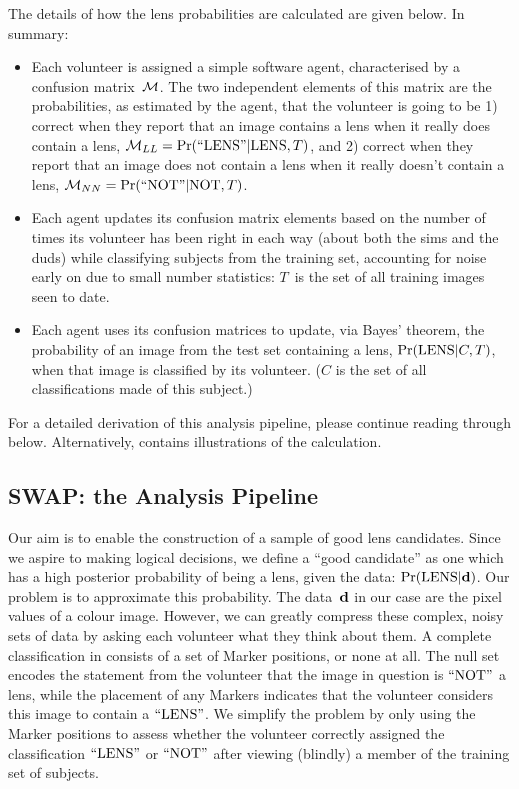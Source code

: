 \documentclass[useAMS,usenatbib,a4paper]{mn2e}
\begin{document}
The details of how the lens probabilities are calculated are given below.
In summary:
\begin{itemize}

\item Each volunteer is assigned a simple software agent, characterised by a
confusion matrix~$\mathcal{M}$. The two independent elements of this matrix are the
probabilities, as estimated by the agent, that the volunteer is going to be 1)
correct when they report that an image contains a lens when it really does
contain a lens, $\mathcal{M}_{LL} = {\rm Pr}({\rm ``LENS"}|{\rm LENS},T)$, and 2) correct when they report that
an image does not contain a lens when it really doesn't contain a lens,
$\mathcal{M}_{NN} = {\rm Pr}({\rm ``NOT"}|{\rm NOT},T)$.

\item Each agent updates its confusion matrix elements based on the number of
times its volunteer has been right in each way (about both the sims and the
duds) while classifying subjects from the training set, accounting for noise
early on due to small number statistics: $T$~is the set of all training images
seen to date.

\item Each agent uses its confusion matrices to update, via Bayes' theorem,
the probability of an image from the test set containing a lens,
${\rm Pr}({\rm LENS}|C,T)$, when that image is classified by its volunteer. ($C$ is the
set of all classifications made of this subject.)

\end{itemize}

For a detailed derivation of this analysis pipeline, please continue reading
through  below. Alternatively, 
contains illustrations of the calculation.



\subsection{SWAP: the \SW Analysis Pipeline}
\label{sec:swap:details}

Our aim is to enable the construction of a sample of good lens candidates.
Since we aspire to making logical  decisions, we define a  ``good candidate''
as one which has a high posterior probability of being a lens, given the data:
${\rm Pr}({\rm LENS}|{\mathbf{d}})$. Our problem is to approximate this probability. The data~${\mathbf{d}}$
in our case are the pixel values of a colour image. However, we can greatly
compress these complex, noisy sets of data by asking each volunteer what they
think about them. A complete  classification in \SW consists of a set of
Marker positions, or none at all. The null set encodes the statement from
the volunteer that the image in question is ${\rm ``NOT"}$ a lens, while the
placement of any  Markers indicates that the volunteer considers this image to
contain a ${\rm ``LENS"}$.  We simplify the problem by only using the Marker
positions to assess whether the volunteer  correctly assigned the
classification ${\rm ``LENS"}$ or ${\rm ``NOT"}$ after viewing (blindly) a member of
the training set of subjects.
\end{document}
